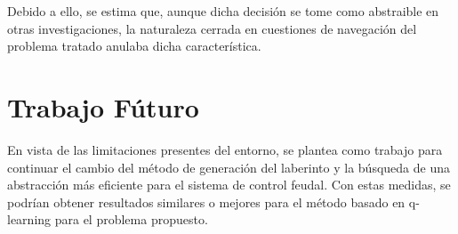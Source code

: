 \documentclass[letterpaper]{article} %
\begin{document}
Debido a ello, se estima que, aunque dicha decisión se tome como abstraible en otras investigaciones, la naturaleza cerrada en cuestiones de navegación del problema
tratado anulaba dicha característica.

\section{Trabajo Fúturo}
En vista de las limitaciones presentes del entorno, se plantea como trabajo para continuar 
el cambio del método de generación del laberinto y la búsqueda de una abstracción más eficiente 
para el sistema de control feudal. Con estas medidas, se podrían obtener resultados similares o 
mejores para el método basado en q-learning para el problema propuesto.



\end{document}
